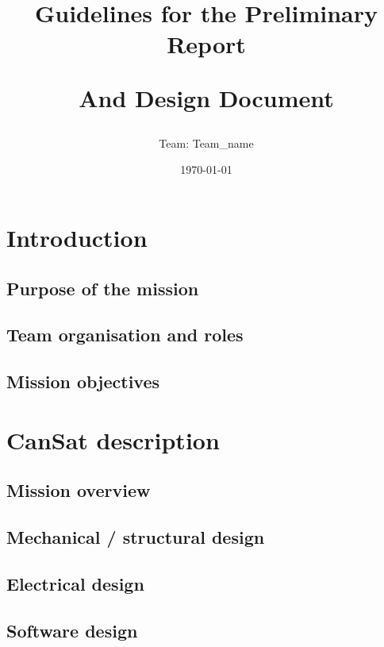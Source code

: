 \documentclass[11pt]{article}
\title{Guidelines for the Preliminary Report

And Design Document
}
\author{Team: Team_name}
\date{\today}
\begin{document}

\tableofcontents
\pagestyle{plain}

\newpage

\section{Introduction}

\subsection{Purpose of the mission}

\subsection{Team organisation and roles}

\subsection{Mission objectives}


\section{CanSat description}

\subsection{Mission overview}

\subsection{Mechanical / structural design}

\subsection{Electrical design}

\subsection{Software design}
\end{document}
